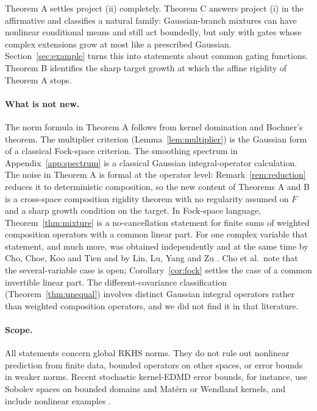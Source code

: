 \documentclass[11pt,a4paper]{article}
\theoremstyle{remark}
\begin{document}
Theorem A settles project (ii) completely. Theorem C answers project (i)
in the affirmative and classifies a natural family: Gaussian-branch
mixtures can have nonlinear conditional means and still act boundedly,
but only with gates whose complex extensions grow at most like a
prescribed Gaussian. Section~\ref{sec:example} turns this into
statements about common gating functions. Theorem B identifies the sharp
target growth at which the affine rigidity of Theorem A stops.

\paragraph{What is not new.}
The norm formula in Theorem A follows from kernel domination and
Bochner's theorem. The multiplier criterion (Lemma~\ref{lem:multiplier})
is the Gaussian form of a classical Fock-space criterion. The smoothing
spectrum in Appendix~\ref{app:spectrum} is a classical Gaussian
integral-operator calculation. The noise in Theorem A is formal at the
operator level: Remark~\ref{rem:reduction} reduces it to deterministic
composition, so the new content of Theorems A and B is a cross-space
composition rigidity theorem with no regularity assumed on $F$ and a
sharp growth condition on the target. In Fock-space language,
Theorem~\ref{thm:mixture} is a no-cancellation statement for finite sums
of weighted composition operators with a common linear part. For one
complex variable that statement, and much more, was obtained
independently and at the same time by Cho, Choe, Koo and Tien
\cite{CCKT2026} and by Lin, Lu, Yang and Zu \cite{LLYZ2026}. Cho et al.\
note that the several-variable case is open; Corollary~\ref{cor:fock}
settles the case of a common invertible linear part. The
different-covariance classification (Theorem~\ref{thm:unequal})
involves distinct Gaussian integral operators rather than weighted
composition operators, and we did not find it in that literature.

\paragraph{Scope.}
All statements concern global RKHS norms. They do not rule out nonlinear
prediction from finite data, bounded operators on other spaces, or error
bounds in weaker norms. Recent stochastic kernel-EDMD error bounds, for
instance, use Sobolev spaces on bounded domains and Mat\'ern or Wendland
kernels, and include nonlinear examples \cite{Hertel2026}.
\end{document}
